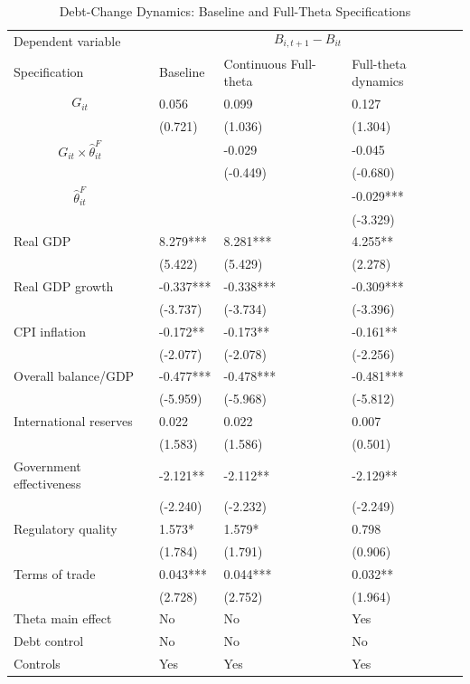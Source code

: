 \begin{table}[H]\centering
\begin{threeparttable}
\caption{Debt-Change Dynamics: Baseline and Full-Theta Specifications}
\label{tab:debt_change_combined_fulltheta}
\scriptsize
\begin{tabularx}{\textwidth}{lYYY}
\toprule
Dependent variable &  \\
\cmidrule(lr){2-4}
Specification & Baseline & Continuous Full-theta & Full-theta dynamics \\
\midrule
$$G_{it}$$ & 0.056 & 0.099 & 0.127 \\
 & (0.721) & (1.036) & (1.304) \\
$$G_{it}\times\widehat{\theta}^{F}_{it}$$ &  & -0.029 & -0.045 \\
 &  & (-0.449) & (-0.680) \\
$$\widehat{\theta}^{F}_{it}$$ &  &  & -0.029*** \\
 &  &  & (-3.329) \\
Real GDP & 8.279*** & 8.281*** & 4.255** \\
 & (5.422) & (5.429) & (2.278) \\
Real GDP growth & -0.337*** & -0.338*** & -0.309*** \\
 & (-3.737) & (-3.734) & (-3.396) \\
CPI inflation & -0.172** & -0.173** & -0.161** \\
 & (-2.077) & (-2.078) & (-2.256) \\
Overall balance/GDP & -0.477*** & -0.478*** & -0.481*** \\
 & (-5.959) & (-5.968) & (-5.812) \\
International reserves & 0.022 & 0.022 & 0.007 \\
 & (1.583) & (1.586) & (0.501) \\
Government effectiveness & -2.121** & -2.112** & -2.129** \\
 & (-2.240) & (-2.232) & (-2.249) \\
Regulatory quality & 1.573* & 1.579* & 0.798 \\
 & (1.784) & (1.791) & (0.906) \\
Terms of trade & 0.043*** & 0.044*** & 0.032** \\
 & (2.728) & (2.752) & (1.964) \\
\midrule
Theta main effect & No & No & Yes \\
Debt control & No & No & No \\
Controls & Yes & Yes & Yes \\

\end{tabularx}
\end{threeparttable}
\end{table}
